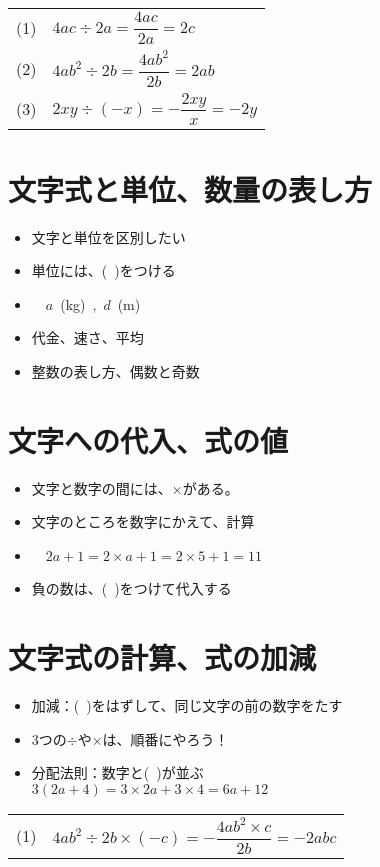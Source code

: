 \documentclass[11pt]{article}
\begin{document}

\begin{tabular}{ll}
(1) & $4ac \div 2a = \dfrac{4ac}{2a} =2c$\\
(2) & $4ab^2 \div 2 b = \dfrac{4ab^2}{2b} = 2ab$\\
(3) & $2xy \div (-x) = - \dfrac{2xy}{x} = -2y$\\
\end{tabular}


\section{文字式と単位、数量の表し方}
\begin{itemize}
\item 文字と単位を区別したい
\item 単位には、(\ )をつける
\item {} \ \ $a$\ (kg)\ ,\ $d$\ (m)
\item 代金、速さ、平均
\item 整数の表し方、偶数と奇数
\end{itemize}


\section{文字への代入、式の値}
\begin{itemize}
\item 文字と数字の間には、$\times$がある。
\item 文字のところを数字にかえて、計算
\item {} \ \ $2a+1 = 2 \times a +1 = 2 \times 5 +1 =11$
\item 負の数は、(\ )をつけて代入する
\end{itemize}

\section{文字式の計算、式の加減}
\begin{itemize}
\item 加減：(\ )をはずして、同じ文字の前の数字をたす
\item 3つの$\div$や$\times$は、順番にやろう！
\item 分配法則：数字と(\ )が並ぶ\\ 
$3(2a+4)=3 \times 2a + 3 \times 4 =6a+12$
\end{itemize}


\begin{tabular}{ll}
(1) & $4ab^2 \div 2 b  \times (-c) = - \dfrac{4ab^2 \times c}{2b} = -2abc$\\
\end{tabular}
\end{document}
